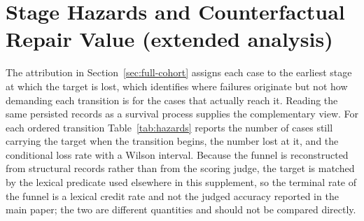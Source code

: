 \documentclass[letterpaper]{article}
\begin{document}
\section{Stage Hazards and Counterfactual Repair Value (extended analysis)}
\label{sec:hazards}

The attribution in Section~\ref{sec:full-cohort} assigns each case to the earliest stage at which the target is lost, which identifies where failures originate but not how demanding each transition is for the cases that actually reach it.
Reading the same persisted records as a survival process supplies the complementary view.
For each ordered transition Table~\ref{tab:hazards} reports the number of cases still carrying the target when the transition begins, the number lost at it, and the conditional loss rate with a Wilson interval.
Because the funnel is reconstructed from structural records rather than from the scoring judge, the target is matched by the lexical predicate used elsewhere in this supplement, so the terminal rate of the funnel is a lexical credit rate and not the judged accuracy reported in the main paper; the two are different quantities and should not be compared directly.
\end{document}
